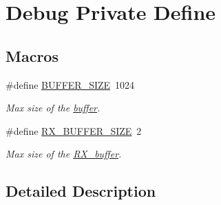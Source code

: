 \hypertarget{group___debug___private___define}{}\section{Debug Private Define}
\label{group___debug___private___define}
\subsection*{Macros}
\begin{DoxyCompactItemize}
\item 
\#define \hyperlink{group___debug___private___define_ga6b20d41d6252e9871430c242cb1a56e7}{B\+U\+F\+F\+E\+R\+\_\+\+S\+I\+ZE}~1024\hypertarget{group___debug___private___define_ga6b20d41d6252e9871430c242cb1a56e7}{}\label{group___debug___private___define_ga6b20d41d6252e9871430c242cb1a56e7}

\begin{DoxyCompactList}\small\item\em Max size of the \hyperlink{group___debug___private___variables_gacab2203504e72e5e674d3174e0bd7d5e}{buffer}. \end{DoxyCompactList}\item 
\#define \hyperlink{group___debug___private___define_ga739a2a1a0047c98ac1b18ecd25dac092}{R\+X\+\_\+\+B\+U\+F\+F\+E\+R\+\_\+\+S\+I\+ZE}~2\hypertarget{group___debug___private___define_ga739a2a1a0047c98ac1b18ecd25dac092}{}\label{group___debug___private___define_ga739a2a1a0047c98ac1b18ecd25dac092}

\begin{DoxyCompactList}\small\item\em Max size of the \hyperlink{group___debug___private___variables_ga17916f59674854b82e55fe3d39a36d81}{R\+X\+\_\+buffer}. \end{DoxyCompactList}\end{DoxyCompactItemize}


\subsection{Detailed Description}
